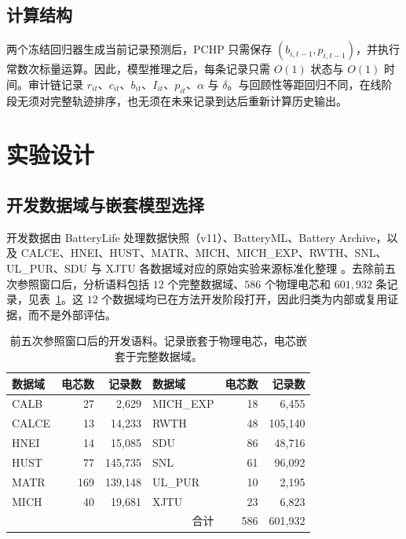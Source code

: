 \documentclass[UTF8,11pt]{ctexart}
\begin{document}
\subsection{计算结构}

两个冻结回归器生成当前记录预测后，PCHP 只需保存 $(b_{i,t-1},p_{i,t-1})$，并执行常数次标量运算。因此，模型推理之后，每条记录只需 $O(1)$ 状态与 $O(1)$ 时间。审计链记录 $r_{it}$、$c_{it}$、$b_{it}$、$I_{it}$、$p_{it}$、$\alpha$ 与 $\delta$。与回顾性等距回归不同，在线阶段无须对完整轨迹排序，也无须在未来记录到达后重新计算历史输出。

\section{实验设计}

\subsection{开发数据域与嵌套模型选择}

开发数据由 BatteryLife 处理数据快照（v11）、BatteryML、Battery Archive，以及 CALCE、HNEI、HUST、MATR、MICH、MICH\_EXP、RWTH、SNL、UL\_PUR、SDU 与 XJTU 各数据域对应的原始实验来源标准化整理 \citep{zhang2024batteryml,tan2025batterylife,batterylife2026processed,batteryarchive,xing2013ensemble,devie2018variability,ma2022personalized,severson2019cyclelife,attia2020closedloop,weng2021formation,li2021oneshot,preger2020degradation,juarezrobles2020safety,wang2025sorting,wang2024pinn}。去除前五次参照窗口后，分析语料包括 $12$ 个完整数据域、$586$ 个物理电芯和 $601{,}932$ 条记录，见表~\ref{tab:data_zh}。这 $12$ 个数据域均已在方法开发阶段打开，因此归类为内部或复用证据，而不是外部评估。

\begin{table}[H]
\centering
\caption{前五次参照窗口后的开发语料。记录嵌套于物理电芯，电芯嵌套于完整数据域。}
\label{tab:data_zh}
\begin{tabular}{lrr@{\qquad}lrr}
\toprule
数据域 & 电芯数 & 记录数 & 数据域 & 电芯数 & 记录数 \\
\midrule
CALB & 27 & 2,629 & MICH\_EXP & 18 & 6,455 \\
CALCE & 13 & 14,233 & RWTH & 48 & 105,140 \\
HNEI & 14 & 15,085 & SDU & 86 & 48,716 \\
HUST & 77 & 145,735 & SNL & 61 & 96,092 \\
MATR & 169 & 139,148 & UL\_PUR & 10 & 2,195 \\
MICH & 40 & 19,681 & XJTU & 23 & 6,823 \\
\midrule
\multicolumn{4}{r}{合计} & 586 & 601,932 \\
\bottomrule
\end{tabular}
\end{table}
\end{document}
